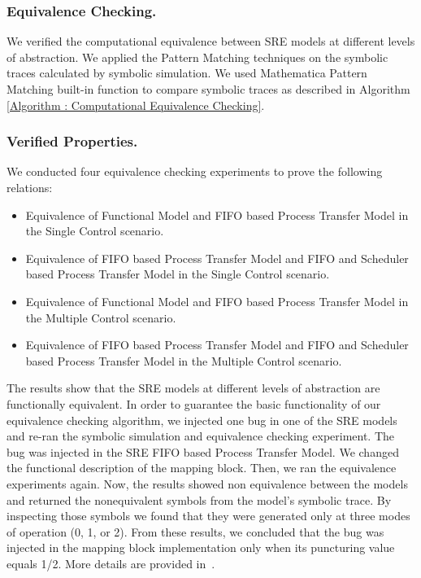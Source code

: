 \documentclass[submission,copyright,creativecommons]{eptcs}
\begin{document}
\subsubsection{Equivalence Checking.}
We verified the computational equivalence between SRE models at different levels of abstraction. We applied the Pattern Matching techniques on the symbolic traces calculated by symbolic simulation. We used Mathematica Pattern Matching built-in function to compare symbolic traces as described in Algorithm \ref{Algorithm : Computational Equivalence Checking}.

\subsubsection{Verified Properties.}

We conducted four equivalence checking experiments to prove the following relations:
\begin{itemize}
  \item Equivalence of Functional Model and FIFO based Process Transfer Model in the Single Control scenario.
  \item Equivalence of FIFO based Process Transfer Model and FIFO and Scheduler based Process Transfer Model in the Single Control scenario.
  \item Equivalence of Functional Model and FIFO based Process Transfer Model in the Multiple Control scenario.
  \item Equivalence of FIFO based Process Transfer Model and FIFO and Scheduler based Process Transfer Model in the Multiple Control scenario.
\end{itemize}
The results show that the SRE models at different levels of abstraction are functionally equivalent. In order to guarantee the basic functionality of our equivalence checking algorithm, we injected one bug in one of the SRE models and re-ran the symbolic simulation and equivalence checking experiment. The bug was injected in the SRE FIFO based Process Transfer Model. We changed the functional description of the mapping block. Then, we ran the equivalence experiments again. Now, the results showed non equivalence between the models and returned the nonequivalent symbols from the model's symbolic trace. By inspecting those symbols we found that they were generated only at three modes of operation (0, 1, or 2). From these results, we concluded that the bug was injected in the mapping block implementation only when its puncturing value equals 1/2. More details are provided in~\cite{saleem_masters_thesis}.
\end{document}
